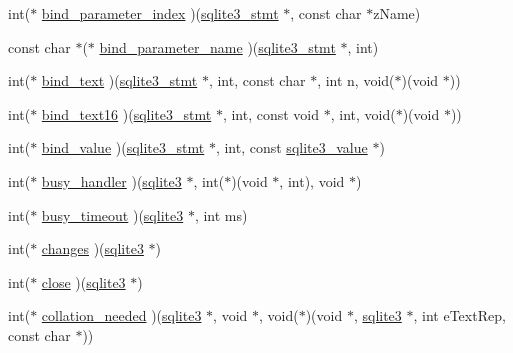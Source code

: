 \begin{DoxyCompactItemize}
\item 
int($\ast$ \hyperlink{structsqlite3__api__routines_a1985681b1e13047a8aae17676debb39d}{bind\-\_\-parameter\-\_\-index} )(\hyperlink{sqlite3_8c_af2a033da1327cdd77f0a174a09aedd0c}{sqlite3\-\_\-stmt} $\ast$, const char $\ast$z\-Name)
\item 
const char $\ast$($\ast$ \hyperlink{structsqlite3__api__routines_ae313944795333d76400e484b08027b01}{bind\-\_\-parameter\-\_\-name} )(\hyperlink{sqlite3_8c_af2a033da1327cdd77f0a174a09aedd0c}{sqlite3\-\_\-stmt} $\ast$, int)
\item 
int($\ast$ \hyperlink{structsqlite3__api__routines_a4e64c1e01f7317ce0924683bf26b165a}{bind\-\_\-text} )(\hyperlink{sqlite3_8c_af2a033da1327cdd77f0a174a09aedd0c}{sqlite3\-\_\-stmt} $\ast$, int, const char $\ast$, int n, void($\ast$)(void $\ast$))
\item 
int($\ast$ \hyperlink{structsqlite3__api__routines_a4613c5fa0a1fac009914ddd0f4415cfd}{bind\-\_\-text16} )(\hyperlink{sqlite3_8c_af2a033da1327cdd77f0a174a09aedd0c}{sqlite3\-\_\-stmt} $\ast$, int, const void $\ast$, int, void($\ast$)(void $\ast$))
\item 
int($\ast$ \hyperlink{structsqlite3__api__routines_aca47715615cc037cd2f850e8c87cd68d}{bind\-\_\-value} )(\hyperlink{sqlite3_8c_af2a033da1327cdd77f0a174a09aedd0c}{sqlite3\-\_\-stmt} $\ast$, int, const \hyperlink{sqlite3_8c_a5bc19e6eab34ccccd953717c04137d88}{sqlite3\-\_\-value} $\ast$)
\item 
int($\ast$ \hyperlink{structsqlite3__api__routines_a4dd578712242bb36acf8568f1c0da278}{busy\-\_\-handler} )(\hyperlink{structsqlite3}{sqlite3} $\ast$, int($\ast$)(void $\ast$, int), void $\ast$)
\item 
int($\ast$ \hyperlink{structsqlite3__api__routines_a403a82d983e3a60444761e4f78d6269c}{busy\-\_\-timeout} )(\hyperlink{structsqlite3}{sqlite3} $\ast$, int ms)
\item 
int($\ast$ \hyperlink{structsqlite3__api__routines_a1379bef0cb6e5e352dc26a34e2d02477}{changes} )(\hyperlink{structsqlite3}{sqlite3} $\ast$)
\item 
int($\ast$ \hyperlink{structsqlite3__api__routines_a26f93f921a5f6709be46902616ca8bcf}{close} )(\hyperlink{structsqlite3}{sqlite3} $\ast$)
\item 
int($\ast$ \hyperlink{structsqlite3__api__routines_a569a60dc0628b75c5cb20edb73d40ab4}{collation\-\_\-needed} )(\hyperlink{structsqlite3}{sqlite3} $\ast$, void $\ast$, void($\ast$)(void $\ast$, \hyperlink{structsqlite3}{sqlite3} $\ast$, int e\-Text\-Rep, const char $\ast$))

\end{DoxyCompactItemize}
